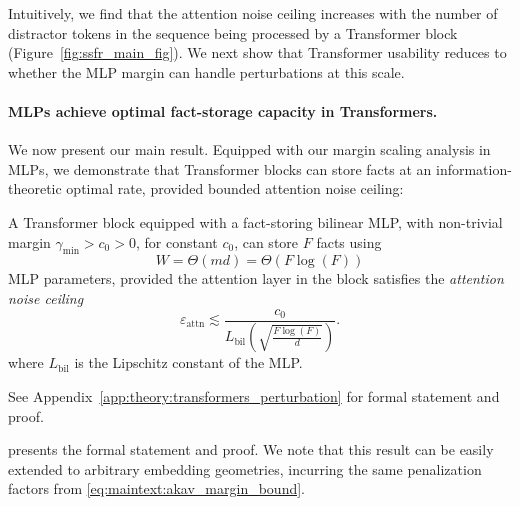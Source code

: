 Intuitively, we find that the attention noise ceiling increases with the number of distractor tokens in the sequence being processed by a Transformer block (Figure~\ref{fig:ssfr_main_fig}). We next show that Transformer usability reduces to whether the MLP margin can handle perturbations at this scale.





\paragraph{MLPs achieve optimal fact-storage capacity in Transformers.}
We now present our main result. Equipped with our margin scaling analysis in MLPs, we demonstrate that Transformer blocks can store facts at an information-theoretic optimal rate, provided bounded attention noise ceiling:

\begin{tcolorbox}[breakable,colback=white,colframe=blue!50!black,boxrule=1.5pt,arc=0mm,left=8pt,right=8pt,top=8pt,bottom=8pt,title={\small\bfseries Key Result: Transformer blocks can store facts at an info-theory optimal rate.},colbacktitle=blue!50!black,coltitle=white,titlerule=0.5pt]
\begin{theorem}
\label{thm:noise-robust-capacity}
A Transformer block equipped with a fact-storing bilinear MLP, with non-trivial margin $\gamma_{\min}>c_0>0$, for constant $c_0$, can store $F$ facts using
\[
  W = \Theta(md)
    = \Theta\!\left(F\log (F)\right)
\]
MLP parameters, provided the attention layer in the block satisfies the \textit{attention noise ceiling}
\begin{equation}
  \varepsilon_{\mathrm{attn}}
  \lesssim
  \frac{c_0}
  {L_{\mathrm{bil}}\!\left(
    \sqrt{\frac{F\log(F)}{d}}
  \right)} .
  \label{eq:eps-cap}
\end{equation}
where $L_{\mathrm{bil}}$ is the Lipschitz constant of the MLP. 
\end{theorem} See Appendix~\ref{app:theory:transformers_perturbation} for formal statement and proof.
\end{tcolorbox}
 presents the formal statement and proof. We note that this result can be easily extended to arbitrary embedding geometries, incurring the same penalization factors from \cref{eq:maintext:akav_margin_bound}.

